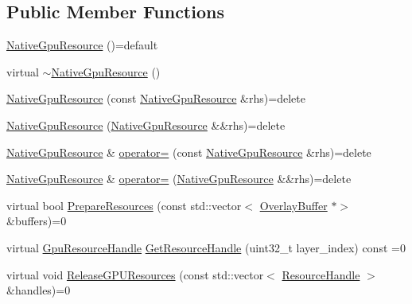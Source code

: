 \subsection*{Public Member Functions}
\begin{DoxyCompactItemize}
\item 
\mbox{\hyperlink{classhwcomposer_1_1NativeGpuResource_abb66041799313063db62e2f597d960e7}{Native\+Gpu\+Resource}} ()=default
\item 
virtual \mbox{\hyperlink{classhwcomposer_1_1NativeGpuResource_ae4b90591c5f9c0864e50a4b81a8ff979}{$\sim$\+Native\+Gpu\+Resource}} ()
\item 
\mbox{\hyperlink{classhwcomposer_1_1NativeGpuResource_a71e5591894f895a1e03e3df0ecd46397}{Native\+Gpu\+Resource}} (const \mbox{\hyperlink{classhwcomposer_1_1NativeGpuResource}{Native\+Gpu\+Resource}} \&rhs)=delete
\item 
\mbox{\hyperlink{classhwcomposer_1_1NativeGpuResource_a3226a2b3927e45d16a5efadf1f5d9bad}{Native\+Gpu\+Resource}} (\mbox{\hyperlink{classhwcomposer_1_1NativeGpuResource}{Native\+Gpu\+Resource}} \&\&rhs)=delete
\item 
\mbox{\hyperlink{classhwcomposer_1_1NativeGpuResource}{Native\+Gpu\+Resource}} \& \mbox{\hyperlink{classhwcomposer_1_1NativeGpuResource_a50e444ab9576fbae96115b36ee6ee385}{operator=}} (const \mbox{\hyperlink{classhwcomposer_1_1NativeGpuResource}{Native\+Gpu\+Resource}} \&rhs)=delete
\item 
\mbox{\hyperlink{classhwcomposer_1_1NativeGpuResource}{Native\+Gpu\+Resource}} \& \mbox{\hyperlink{classhwcomposer_1_1NativeGpuResource_a863b08b543c7a739a373fedf15cd2845}{operator=}} (\mbox{\hyperlink{classhwcomposer_1_1NativeGpuResource}{Native\+Gpu\+Resource}} \&\&rhs)=delete
\item 
virtual bool \mbox{\hyperlink{classhwcomposer_1_1NativeGpuResource_a3f1da37f41ff245e1bfe9e44d69a3202}{Prepare\+Resources}} (const std\+::vector$<$ \mbox{\hyperlink{classhwcomposer_1_1OverlayBuffer}{Overlay\+Buffer}} $\ast$$>$ \&buffers)=0
\item 
virtual \mbox{\hyperlink{namespacehwcomposer_a3da411c7c0213da2ce847c654bdc180d}{Gpu\+Resource\+Handle}} \mbox{\hyperlink{classhwcomposer_1_1NativeGpuResource_a3d514dcd1abfb90b874f681a7d7f50f7}{Get\+Resource\+Handle}} (uint32\+\_\+t layer\+\_\+index) const =0
\item 
virtual void \mbox{\hyperlink{classhwcomposer_1_1NativeGpuResource_aeeedb37b304fcf7d005f6f409d88e0f5}{Release\+G\+P\+U\+Resources}} (const std\+::vector$<$ \mbox{\hyperlink{namespacehwcomposer_a963c5a1d5902d2d05710dba19af35b48}{Resource\+Handle}} $>$ \&handles)=0
\end{DoxyCompactItemize}



